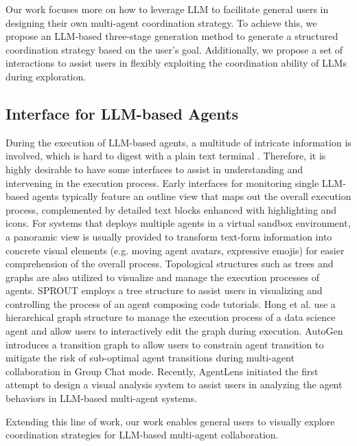 Our work focuses more on how to leverage LLM to facilitate general users in designing their own multi-agent coordination strategy. To achieve this, we propose an LLM-based three-stage generation method to generate a structured coordination strategy based on the user's goal. Additionally, we propose a set of interactions to assist users in flexibly exploiting the coordination ability of LLMs during exploration.


\subsection{Interface for LLM-based Agents}
During the execution of LLM-based agents, a multitude of intricate information is involved, which is hard to digest with a plain text terminal \cite{weng2024insightlens,lu2024agentlens}. Therefore, it is highly desirable to have some interfaces to assist in understanding and intervening in the execution process. Early interfaces \cite{AgentGPT, xagent2023, SuperAGI} for monitoring single LLM-based agents typically feature an outline view that maps out the overall execution process, complemented by detailed text blocks enhanced with highlighting and icons. For systems\cite{park2023generative, lin2023agentsims, CooperativeEmbodiedAgent, chetDev} that deploys multiple agents in a virtual sandbox environment, a panoramic view is usually provided to transform text-form information into concrete visual elements (e.g. moving agent avatars, expressive emojis) for easier comprehension of the overall process. Topological structures such as trees and graphs are also utilized to visualize and manage the execution processes of agents. SPROUT\cite{liu2023sprout} employs a tree structure to assist users in visualizing and controlling the process of an agent composing code tutorials. Hong et al. \cite{hong2024data} use a hierarchical graph structure to manage the execution process of a data science agent and allow users to interactively edit the graph during execution. AutoGen \cite{wu2023autogen} introduces a transition graph to allow users to constrain agent transition to mitigate the risk of sub-optimal agent transitions during multi-agent collaboration in Group Chat mode. Recently, AgentLens \cite{lu2024agentlens} initiated the first attempt to design a visual analysis system to assist users in analyzing the agent behaviors in LLM-based multi-agent systems.

Extending this line of work, our work enables general users to visually explore coordination strategies for LLM-based multi-agent collaboration. 



